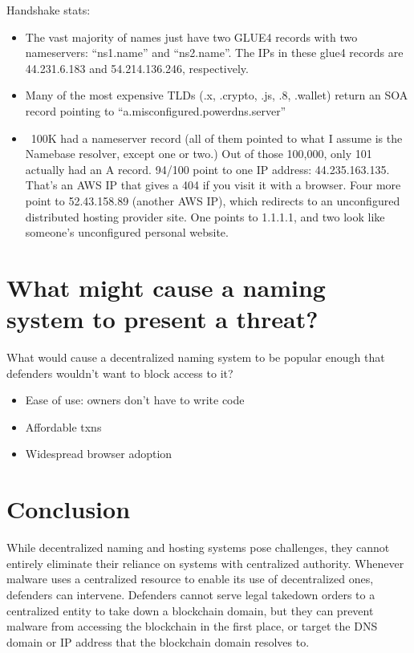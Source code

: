 \documentclass[10pt,sigconf,letterpaper]{acmart}
\begin{document}
Handshake stats:
\begin{itemize}
	\item The vast majority of names just have two GLUE4 
	records with two nameservers: “ns1.name” and “ns2.name”. 
	The IPs in these glue4 records are 44.231.6.183 and 
	54.214.136.246, respectively.
	\item Many of the most expensive TLDs (.x, .crypto, .js, 
	.8, .wallet) return an SOA record pointing to 
	``a.misconfigured.powerdns.server''
	\item ~100K had a nameserver record (all of them pointed 
	to what I assume is the Namebase resolver, except one or 
	two.) Out of those 100,000, only 101 actually had an A 
	record. 94/100 point to one IP address: 44.235.163.135. 
	That's an AWS IP that gives a 404 if you visit it with a 
	browser. Four more point to 52.43.158.89 (another AWS 
	IP), which redirects to an unconfigured distributed 
	hosting provider site. One points to 1.1.1.1, and two 
	look like someone's unconfigured personal website.
\end{itemize}

\section{What might cause a naming system to present a threat?}

What would cause a decentralized naming system to be popular enough that 
defenders wouldn't want to block access to it?
\begin{itemize}
	\item Ease of use: owners don't have to write code
	\item Affordable txns
	\item Widespread browser adoption
\end{itemize}

\section{Conclusion}

While decentralized naming and hosting systems pose challenges, they cannot entirely 
eliminate their reliance on systems with centralized authority. Whenever malware uses a centralized 
resource to enable its use of decentralized ones, defenders can intervene. Defenders cannot serve 
legal takedown orders to a centralized entity to take 
down a blockchain domain, but they can prevent malware from accessing the blockchain in the first 
place, or target the DNS domain or IP address that the blockchain domain resolves to.
\end{document}
